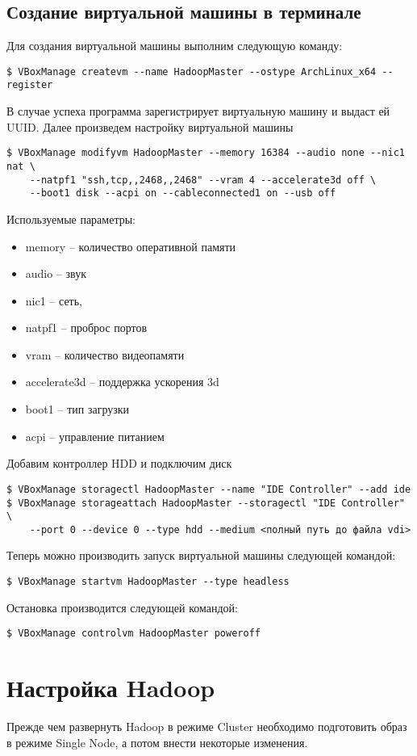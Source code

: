 \subsection{Создание виртуальной машины в терминале}
Для создания виртуальной машины выполним следующую команду:
\begin{lstlisting}
$ VBoxManage createvm --name HadoopMaster --ostype ArchLinux_x64 --register
\end{lstlisting}
В случае успеха программа зарегистрирует виртуальную машину и выдаст ей UUID. Далее произведем настройку 
виртуальной машины
\begin{lstlisting}
$ VBoxManage modifyvm HadoopMaster --memory 16384 --audio none --nic1 nat \
    --natpf1 "ssh,tcp,,2468,,2468" --vram 4 --accelerate3d off \
    --boot1 disk --acpi on --cableconnected1 on --usb off
\end{lstlisting}
Используемые параметры:
\begin{itemize}
    \item memory -- количество оперативной памяти
    \item audio -- звук
    \item nic1 -- сеть, 
    \item natpf1 -- проброс портов
    \item vram -- количество видеопамяти
    \item accelerate3d -- поддержка ускорения 3d
    \item boot1 -- тип загрузки
    \item acpi -- управление питанием
\end{itemize}
Добавим контроллер HDD и подключим диск
\begin{lstlisting}
$ VBoxManage storagectl HadoopMaster --name "IDE Controller" --add ide
$ VBoxManage storageattach HadoopMaster --storagectl "IDE Controller" \
    --port 0 --device 0 --type hdd --medium <полный путь до файла vdi>
\end{lstlisting}
Теперь можно производить запуск виртуальной машины следующей командой:
\begin{lstlisting}
$ VBoxManage startvm HadoopMaster --type headless
\end{lstlisting}
Остановка производится следующей командой:
\begin{lstlisting}
$ VBoxManage controlvm HadoopMaster poweroff
\end{lstlisting}

\section{Настройка Hadoop}
Прежде чем развернуть Hadoop в режиме Cluster необходимо подготовить образ в режиме Single Node, а потом 
внести некоторые изменения.

